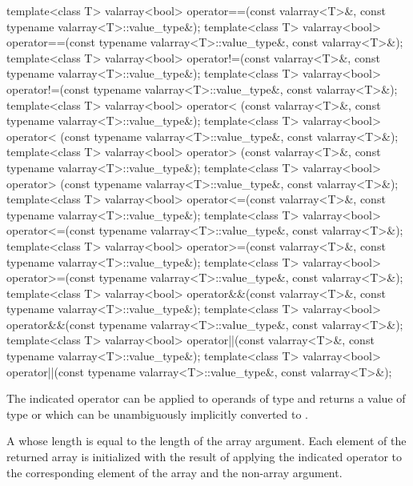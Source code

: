 \begin{itemdecl}
template<class T> valarray<bool> operator==(const valarray<T>&,
                                            const typename valarray<T>::value_type&);
template<class T> valarray<bool> operator==(const typename valarray<T>::value_type&,
                                            const valarray<T>&);
template<class T> valarray<bool> operator!=(const valarray<T>&,
                                            const typename valarray<T>::value_type&);
template<class T> valarray<bool> operator!=(const typename valarray<T>::value_type&,
                                            const valarray<T>&);
template<class T> valarray<bool> operator< (const valarray<T>&,
                                            const typename valarray<T>::value_type&);
template<class T> valarray<bool> operator< (const typename valarray<T>::value_type&,
                                            const valarray<T>&);
template<class T> valarray<bool> operator> (const valarray<T>&,
                                            const typename valarray<T>::value_type&);
template<class T> valarray<bool> operator> (const typename valarray<T>::value_type&,
                                            const valarray<T>&);
template<class T> valarray<bool> operator<=(const valarray<T>&,
                                            const typename valarray<T>::value_type&);
template<class T> valarray<bool> operator<=(const typename valarray<T>::value_type&,
                                            const valarray<T>&);
template<class T> valarray<bool> operator>=(const valarray<T>&,
                                            const typename valarray<T>::value_type&);
template<class T> valarray<bool> operator>=(const typename valarray<T>::value_type&,
                                            const valarray<T>&);
template<class T> valarray<bool> operator&&(const valarray<T>&,
                                            const typename valarray<T>::value_type&);
template<class T> valarray<bool> operator&&(const typename valarray<T>::value_type&,
                                            const valarray<T>&);
template<class T> valarray<bool> operator||(const valarray<T>&,
                                            const typename valarray<T>::value_type&);
template<class T> valarray<bool> operator||(const typename valarray<T>::value_type&,
                                            const valarray<T>&);
\end{itemdecl}

\begin{itemdescr}
\pnum
\mandates
The indicated operator can be applied to operands of type  and returns
a value of type  or which can be unambiguously
implicitly converted to .

\pnum
\returns
A  whose
length is equal to the length of the array argument.
Each element
of the returned array is initialized with the result of applying the
indicated operator to the corresponding element of the array and the non-array argument.
\end{itemdescr}

